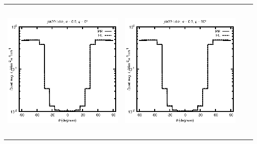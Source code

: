 \begin{tabular}{c c c c}
\includegraphics[height=7cm]{../eps/jok00_Ld_ir_fwd.eps} &
\includegraphics[height=7cm]{../eps/jok00_Ld_ir_cross.eps} \\
\end{tabular}

\pagebreak


